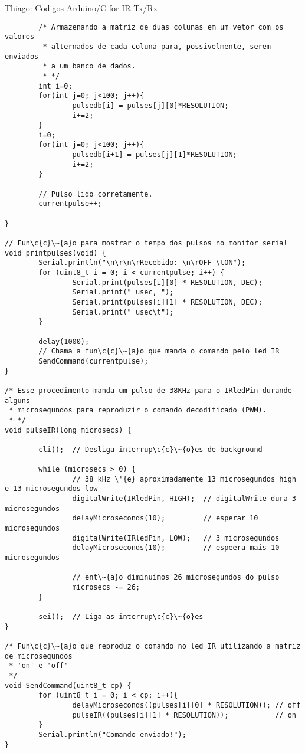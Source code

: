 \begin{section}{Thiago: Codigos Arduino/C for IR Tx/Rx}
\begin{lstlisting}
		/* Armazenando a matriz de duas colunas em um vetor com os valores
		 * alternados de cada coluna para, possivelmente, serem enviados
		 * a um banco de dados.
		 * */
		int i=0;
		for(int j=0; j<100; j++){
				pulsedb[i] = pulses[j][0]*RESOLUTION;
				i+=2; 
		}
		i=0;
		for(int j=0; j<100; j++){
				pulsedb[i+1] = pulses[j][1]*RESOLUTION;
				i+=2; 
		}

		// Pulso lido corretamente. 
		currentpulse++;

}

// Fun\c{c}\~{a}o para mostrar o tempo dos pulsos no monitor serial
void printpulses(void) {
		Serial.println("\n\r\n\rRecebido: \n\rOFF \tON");
		for (uint8_t i = 0; i < currentpulse; i++) {
				Serial.print(pulses[i][0] * RESOLUTION, DEC);
				Serial.print(" usec, ");
				Serial.print(pulses[i][1] * RESOLUTION, DEC);
				Serial.print(" usec\t");
		}

		delay(1000);
		// Chama a fun\c{c}\~{a}o que manda o comando pelo led IR
		SendCommand(currentpulse);
}

/* Esse procedimento manda um pulso de 38KHz para o IRledPin durande alguns 
 * microsegundos para reproduzir o comando decodificado (PWM).
 * */
void pulseIR(long microsecs) {

		cli();  // Desliga interrup\c{c}\~{o}es de background

		while (microsecs > 0) {
				// 38 kHz \'{e} aproximadamente 13 microsegundos high e 13 microsegundos low
				digitalWrite(IRledPin, HIGH);  // digitalWrite dura 3 microsegundos
				delayMicroseconds(10);         // esperar 10 microsegundos
				digitalWrite(IRledPin, LOW);   // 3 microsegundos
				delayMicroseconds(10);         // espeera mais 10 microsegundos

				// ent\~{a}o diminuímos 26 microsegundos do pulso
				microsecs -= 26;
		}

		sei();  // Liga as interrup\c{c}\~{o}es
}

/* Fun\c{c}\~{a}o que reproduz o comando no led IR utilizando a matriz de microsegundos
 * 'on' e 'off'
 */
void SendCommand(uint8_t cp) {
		for (uint8_t i = 0; i < cp; i++){
				delayMicroseconds((pulses[i][0] * RESOLUTION)); // off
				pulseIR((pulses[i][1] * RESOLUTION));           // on
		}
		Serial.println("Comando enviado!");
}
\end{lstlisting}
\end{section}
